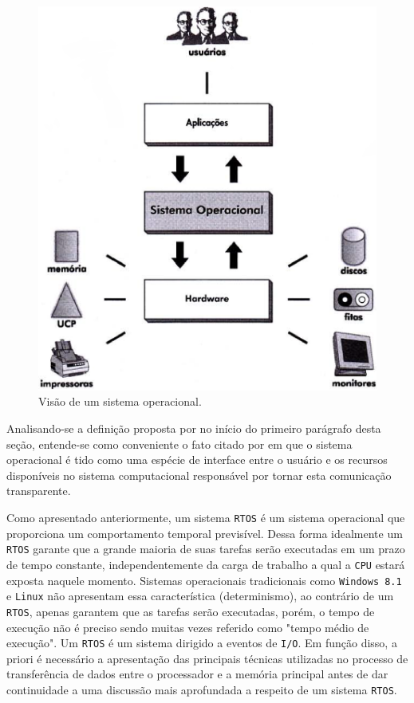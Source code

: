 \begin{figure}[h]
	\centering
	\caption{\label{so}Visão de um sistema operacional.}
		\includegraphics[keepaspectratio=true,scale=0.5]{figuras/so.eps}
\end{figure}

Analisando-se a definição proposta por \cite{limaevilaca} no início do primeiro parágrafo desta seção, entende-se como conveniente o fato citado por \cite{machadomaia} em que o sistema operacional é tido como uma espécie de interface entre o usuário e os recursos disponíveis no sistema computacional responsável por tornar esta comunicação transparente.

Como apresentado anteriormente, um sistema \texttt{RTOS} é um sistema operacional que proporciona um comportamento temporal previsível. Dessa forma idealmente um \texttt{RTOS} garante que a grande maioria de suas tarefas serão executadas em um prazo de tempo constante, independentemente da carga de trabalho a qual a \texttt{CPU} estará exposta naquele momento. Sistemas operacionais tradicionais como \texttt{Windows 8.1} e \texttt{Linux} não apresentam essa característica (determinismo), ao contrário de um \texttt{RTOS}, apenas garantem que as tarefas serão executadas, porém, o tempo de execução não é preciso sendo muitas vezes referido como "tempo médio de execução". Um \texttt{RTOS} é um sistema dirigido a eventos de \texttt{I/O}. Em função disso, a priori é necessário a apresentação das principais técnicas utilizadas no processo de transferência de dados entre o processador e a memória principal antes de dar continuidade a uma discussão mais aprofundada a respeito de um sistema \texttt{RTOS}.

